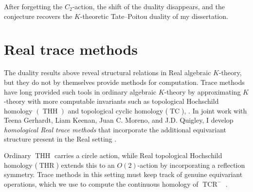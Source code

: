 \documentclass[11pt]{article}
\newcommand{\THH}{\operatorname{THH}}
\begin{document}
After forgetting the \(C_2\)-action, the shift of the duality disappears, and the conjecture recovers the \(K\)-theoretic Tate--Poitou duality of my dissertation.

\section{Real trace methods}
The duality results above reveal structural relations in Real algebraic $K$-theory, but they do not by themselves provide methods for computation.
Trace methods have long provided such tools in ordinary algebraic $K$-theory by approximating $K$-theory with more computable invariants such as topological Hochschild homology $(\THH)$ and topological cyclic homology ($\operatorname{TC}$), \cite{MR1202133}.
In joint work with Teena Gerhardt, Liam Keenan, Juan C. Moreno, and J.D. Quigley, I develop \emph{homological Real trace methods} that incorporate the additional equivariant structure present in the Real setting \cite{CGKMQ}.

Ordinary $\operatorname{THH}$ carries a circle action, while Real topological Hochschild homology ($\operatorname{THR}$) extends this to an $O(2)$-action by incorporating a reflection symmetry.
Trace methods in this setting must keep track of genuine equivariant operations, which we use to compute the continuous homology of $\operatorname{TCR}^-$ \cite{QS22}.
\end{document}
